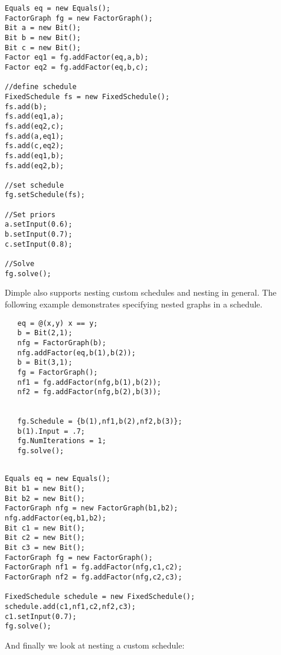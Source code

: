 \fi

\ifjava
\begin{lstlisting}
Equals eq = new Equals();
FactorGraph fg = new FactorGraph();
Bit a = new Bit();
Bit b = new Bit();
Bit c = new Bit();
Factor eq1 = fg.addFactor(eq,a,b);
Factor eq2 = fg.addFactor(eq,b,c);

//define schedule
FixedSchedule fs = new FixedSchedule();
fs.add(b);
fs.add(eq1,a);
fs.add(eq2,c);
fs.add(a,eq1);
fs.add(c,eq2);
fs.add(eq1,b);
fs.add(eq2,b);
		
//set schedule
fg.setSchedule(fs);

//Set priors
a.setInput(0.6);
b.setInput(0.7);
c.setInput(0.8);

//Solve
fg.solve();
\end{lstlisting}
\fi

Dimple also supports nesting custom schedules and nesting in general. The following example demonstrates specifying nested graphs in a schedule.

\ifmatlab

\begin{lstlisting}
   eq = @(x,y) x == y;
   b = Bit(2,1);
   nfg = FactorGraph(b);
   nfg.addFactor(eq,b(1),b(2));
   b = Bit(3,1);
   fg = FactorGraph();
   nf1 = fg.addFactor(nfg,b(1),b(2));
   nf2 = fg.addFactor(nfg,b(2),b(3));
   
   
   fg.Schedule = {b(1),nf1,b(2),nf2,b(3)};
   b(1).Input = .7;
   fg.NumIterations = 1;
   fg.solve();
\end{lstlisting}

\fi

\ifjava
\begin{lstlisting}

Equals eq = new Equals();
Bit b1 = new Bit();
Bit b2 = new Bit();
FactorGraph nfg = new FactorGraph(b1,b2);
nfg.addFactor(eq,b1,b2);
Bit c1 = new Bit();
Bit c2 = new Bit();
Bit c3 = new Bit();
FactorGraph fg = new FactorGraph();
FactorGraph nf1 = fg.addFactor(nfg,c1,c2);
FactorGraph nf2 = fg.addFactor(nfg,c2,c3);

FixedSchedule schedule = new FixedSchedule();
schedule.add(c1,nf1,c2,nf2,c3);
c1.setInput(0.7);
fg.solve();
\end{lstlisting}

\fi


And finally we look at nesting a custom schedule:

\ifmatlab

